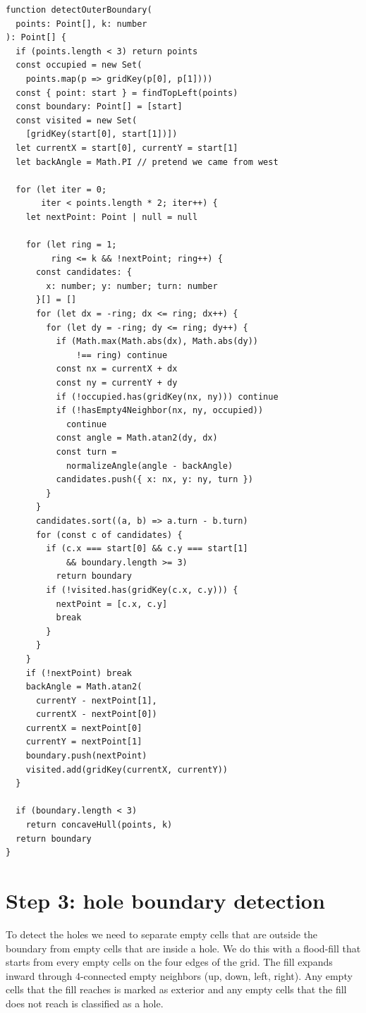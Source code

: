\documentclass[12pt]{extreport}
\begin{document}
\begin{lstlisting}[style=tsstyle, caption={Boundary walk (\texttt{grid.ts})}]
function detectOuterBoundary(
  points: Point[], k: number
): Point[] {
  if (points.length < 3) return points
  const occupied = new Set(
    points.map(p => gridKey(p[0], p[1])))
  const { point: start } = findTopLeft(points)
  const boundary: Point[] = [start]
  const visited = new Set(
    [gridKey(start[0], start[1])])
  let currentX = start[0], currentY = start[1]
  let backAngle = Math.PI // pretend we came from west

  for (let iter = 0;
       iter < points.length * 2; iter++) {
    let nextPoint: Point | null = null

    for (let ring = 1;
         ring <= k && !nextPoint; ring++) {
      const candidates: {
        x: number; y: number; turn: number
      }[] = []
      for (let dx = -ring; dx <= ring; dx++) {
        for (let dy = -ring; dy <= ring; dy++) {
          if (Math.max(Math.abs(dx), Math.abs(dy))
              !== ring) continue
          const nx = currentX + dx
          const ny = currentY + dy
          if (!occupied.has(gridKey(nx, ny))) continue
          if (!hasEmpty4Neighbor(nx, ny, occupied))
            continue
          const angle = Math.atan2(dy, dx)
          const turn =
            normalizeAngle(angle - backAngle)
          candidates.push({ x: nx, y: ny, turn })
        }
      }
      candidates.sort((a, b) => a.turn - b.turn)
      for (const c of candidates) {
        if (c.x === start[0] && c.y === start[1]
            && boundary.length >= 3)
          return boundary
        if (!visited.has(gridKey(c.x, c.y))) {
          nextPoint = [c.x, c.y]
          break
        }
      }
    }
    if (!nextPoint) break
    backAngle = Math.atan2(
      currentY - nextPoint[1],
      currentX - nextPoint[0])
    currentX = nextPoint[0]
    currentY = nextPoint[1]
    boundary.push(nextPoint)
    visited.add(gridKey(currentX, currentY))
  }

  if (boundary.length < 3)
    return concaveHull(points, k)
  return boundary
}
\end{lstlisting}

\section{Step 3: hole boundary detection}

To detect the holes we need to separate empty cells that are outside the boundary from empty cells that are inside a hole. We do this with a flood-fill that starts from every empty cells on the four edges of the grid. The fill expands inward through 4-connected empty neighbors (up, down, left, right). Any empty cells that the fill reaches is marked as exterior and any empty cells that the fill does not reach is classified as a hole.
\end{document}
